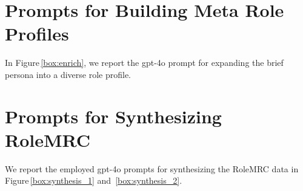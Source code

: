 \section{Prompts for Building Meta Role Profiles}
\label{sec:app_prompt_1}
In Figure\,\ref{box:enrich}, we report the gpt-4o prompt for expanding the brief persona into a diverse role profile.

\section{Prompts for Synthesizing RoleMRC}
\label{sec:app_prompt_2}
We report the employed gpt-4o prompts for synthesizing the RoleMRC data in Figure\,\ref{box:synthesis_1} and \,\ref{box:synthesis_2}.

\begin{figure*}
\begin{tcolorbox}[
    colback=gray!10,      %
    colframe=gray!80,     %
    title=Synthesis Prompt for the meta role profile,
    fonttitle=\bfseries,  %
    rounded corners,
    boxrule=0.5mm,        %
    width=\linewidth
]
\scriptsize


\end{tcolorbox}
\end{figure*}
